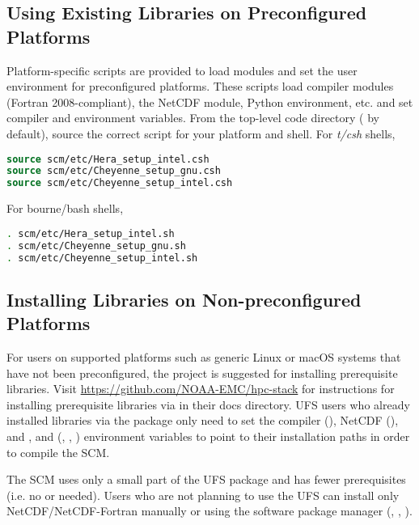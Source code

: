 \subsection{Using Existing Libraries on Preconfigured Platforms}\label{section: use_preconfigured_platforms}
Platform-specific scripts are provided to load modules and set the user environment for preconfigured platforms. These scripts load compiler modules (Fortran 2008-compliant), the NetCDF module, Python environment, etc. and set compiler and environment variables. From the top-level code directory ( by default), source the correct script for your platform and shell. For \textit{t/csh} shells,
\begin{lstlisting}[language=csh]
source scm/etc/Hera_setup_intel.csh
source scm/etc/Cheyenne_setup_gnu.csh
source scm/etc/Cheyenne_setup_intel.csh
\end{lstlisting}
For bourne/bash shells,
\begin{lstlisting}[language=bash]
. scm/etc/Hera_setup_intel.sh
. scm/etc/Cheyenne_setup_gnu.sh
. scm/etc/Cheyenne_setup_intel.sh
\end{lstlisting}


\subsection{Installing Libraries on Non-preconfigured Platforms}\label{section: setup_supported_platforms}
For users on supported platforms such as generic Linux or macOS systems that have not been preconfigured, the  project is suggested for installing prerequisite libraries. Visit \url{https://github.com/NOAA-EMC/hpc-stack} for instructions for installing prerequisite libraries via  in their docs directory. UFS users who already installed libraries via the  package only need to set the compiler (), NetCDF (), and ,   and  (, , ) environment variables to point to their installation paths in order to compile the SCM. 

The SCM uses only a small part of the UFS  package and has fewer prerequisites (i.e. no  or  needed). Users who are not planning to use the UFS can install only NetCDF/NetCDF-Fortran manually or using the software package manager (, , ).


